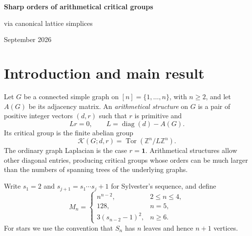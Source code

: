 \documentclass[11pt]{article}
\theoremstyle{remark}
\DeclareMathOperator{\diag}{diag}
\DeclareMathOperator{\Tor}{Tor}
\newcommand{\Z}{\mathbb Z}
\newcommand{\K}{\mathcal K}
\newcommand{\one}{\mathbf 1}
\begin{document}
\begin{center}
{\Large\bfseries Sharp orders of arithmetical critical groups}\par\vspace{5pt}
{\large via canonical lattice simplices}\par\vspace{8pt}
September 2026
\end{center}
\begin{abstract}
We identify the critical group of an arithmetical structure on a connected simple graph with the vertex-lattice quotient of a canonical lattice simplex. Applying the sharp multiplicity theorem of Averkov, Kasprzyk, Lehmann and Nill, we determine the largest possible critical-group order among all such structures on graphs with a fixed number of vertices. Complete graphs attain the bound. The same bound holds for stars with a fixed number of leaves, proving the largest-order conjecture of Archer, Diaz-Lopez, Glass and Louwsma. We also determine the maximizing arithmetical structures on complete graphs and stars.
\end{abstract}

\section{Introduction and main result}

Let $G$ be a connected simple graph on $[n]=\{1,\ldots,n\}$, with $n\geq2$, and let $A(G)$ be its adjacency matrix. An \emph{arithmetical structure} on $G$ is a pair of positive integer vectors $(d,r)$ such that $r$ is primitive and
\[
 Lr=0,\qquad L=\diag(d)-A(G).
\]
Its critical group is the finite abelian group
\[
 \K(G;d,r)=\Tor(\Z^n/L\Z^n).
\]
The ordinary graph Laplacian is the case $r=\one$. Arithmetical structures allow other diagonal entries, producing critical groups whose orders can be much larger than the numbers of spanning trees of the underlying graphs.

Write $s_1=2$ and $s_{j+1}=s_1\cdots s_j+1$ for Sylvester's sequence, and define
\begin{equation}\label{eq:bound}
 M_n=\begin{cases}
 n^{n-2},&2\leq n\leq4,\\
 128,&n=5,\\
 3(s_{n-2}-1)^2,&n\geq6.
 \end{cases}
\end{equation}
For stars we use the convention that $S_n$ has $n$ leaves and hence $n+1$ vertices.
\end{document}
